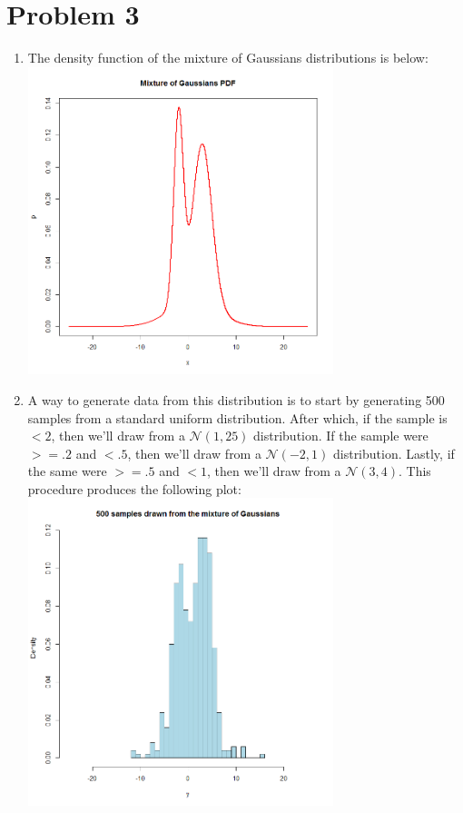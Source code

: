 \documentclass[12pt,letterpaper]{article}
\begin{document}
  \section*{Problem 3}
        \begin{enumerate}[label={(\alph*) }]
                \item The density function of the mixture of Gaussians distributions is below: \\
                \includegraphics[width=3.5in]{3a_pdf.png}
                \item A way to generate data from this distribution is to start by generating 500 samples from a standard uniform distribution. After which, if the sample is $<2$, then we'll draw from a $\mathcal{N}(1,25)$ distribution. If the sample were $>=.2$ and $<.5$, then we'll draw from a $\mathcal{N}(-2,1)$ distribution. Lastly, if the same were $>=.5$ and $<1$, then we'll draw from a $\mathcal{N}(3,4)$. This procedure produces the following plot: \\
                \includegraphics[width=3.5in]{3b_hist.png}

\end{enumerate}
\end{document}
